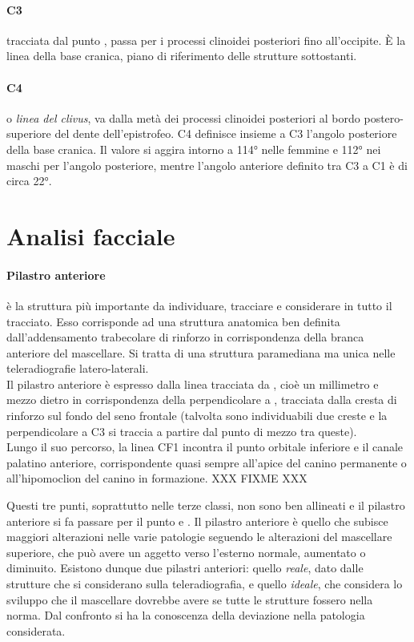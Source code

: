 \paragraph{C3} tracciata dal punto , passa per i processi clinoidei posteriori fino all'occipite. È la linea della base cranica, piano di riferimento delle strutture sottostanti.

\paragraph{C4} o \emph{linea del clivus}, va dalla metà dei processi clinoidei posteriori al bordo postero-superiore del dente dell'epistrofeo. C4 definisce insieme a C3 l'angolo posteriore della base cranica. Il valore si aggira intorno a 114° nelle femmine e 112° nei maschi per l'angolo posteriore, mentre l'angolo anteriore definito tra C3 a C1 è di circa 22°.

\section{Analisi facciale}
\paragraph{Pilastro anteriore} è la struttura più importante da individuare, tracciare e considerare in tutto il tracciato. Esso corrisponde ad una struttura anatomica ben definita dall'addensamento trabecolare di rinforzo in corrispondenza della branca anteriore del mascellare. Si tratta di una struttura paramediana ma unica nelle teleradiografie latero-laterali.\\

Il pilastro anteriore è espresso dalla linea  tracciata da , cioè un millimetro e mezzo dietro  in corrispondenza della perpendicolare a , tracciata dalla cresta di rinforzo sul fondo del seno frontale (talvolta sono individuabili due creste e la perpendicolare a C3 si traccia a partire dal punto di mezzo tra queste).\\

Lungo il suo percorso, la linea CF1 incontra il punto orbitale inferiore e il canale palatino anteriore, corrispondente quasi sempre all'apice del canino permanente o all'hipomoclion del canino in formazione. XXX FIXME XXX

Questi tre punti, soprattutto nelle terze classi, non sono ben allineati e il pilastro anteriore si fa passare per il punto  e . Il pilastro anteriore è quello che subisce maggiori alterazioni nelle varie patologie seguendo le alterazioni del mascellare superiore, che può avere un aggetto verso l'esterno normale, aumentato o diminuito. Esistono dunque due pilastri anteriori: quello \emph{reale}, dato dalle strutture che si considerano sulla teleradiografia, e quello \emph{ideale}, che considera lo sviluppo che il mascellare dovrebbe avere se tutte le strutture fossero nella norma. Dal confronto si ha la conoscenza della deviazione nella patologia considerata.\\

